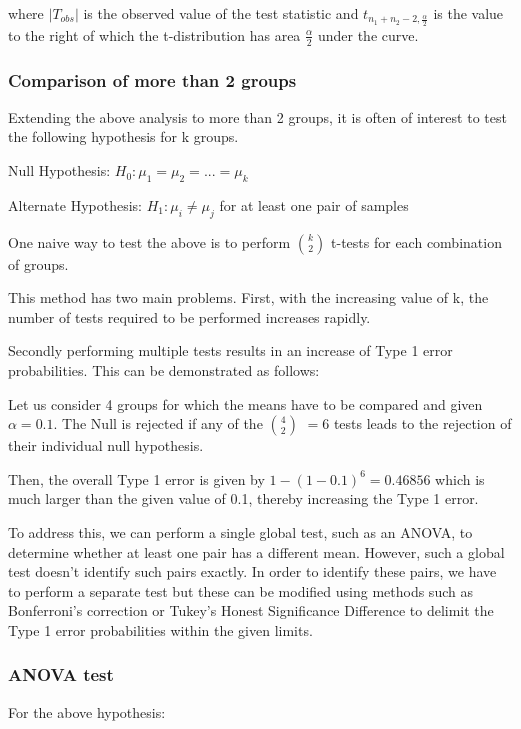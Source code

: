 \documentclass[fontsize=12 pt]{scrartcl}
\begin{document}
where $|T_{obs}|$ is the observed value of the test statistic and
$t_{n_1+n_2-2, \frac{\alpha}{2}} $ is the value to the right of which the t-distribution has area $\frac{\alpha}{2} $ under the curve.\citep [p.~63]{Book2}




\subsubsection{Comparison of more than 2 groups}

Extending the above analysis to more than 2 groups, it is often of interest to test the following hypothesis for k groups.

Null Hypothesis: $H_0 : \mu_1 = \mu_2 = ... = \mu_k$

Alternate Hypothesis: $H_1 : \mu_i \neq \mu_j$ for at least one pair of samples

One naive way to test the above is to perform $k \choose 2$ t-tests for each combination of groups.

This method has two main problems. First, with the increasing value of k, the number of tests required to be performed increases rapidly.

Secondly performing multiple tests results in an increase of Type 1 error probabilities. This can be demonstrated as follows:

Let us consider 4 groups for which the means have to be compared and given $\alpha = 0.1$. The Null is rejected if any of the $4 \choose 2$ $= 6$ tests leads to the rejection of their individual null hypothesis. 

Then, the overall Type 1 error is given by $1 - (1-0.1)^6 = 0.46856$ which is much larger than the given value of 0.1, thereby increasing the Type 1 error.

To address this, we can perform a single global test, such as an ANOVA, to determine whether at least one pair has a different mean. However, such a global test doesn't identify such pairs exactly. In order to identify these pairs, we have to perform a separate test but these can be modified using methods such as Bonferroni's correction or Tukey's Honest Significance Difference to delimit the Type 1 error probabilities within the given limits.

\subsubsection{ANOVA test}
For the above hypothesis:
\end{document}
